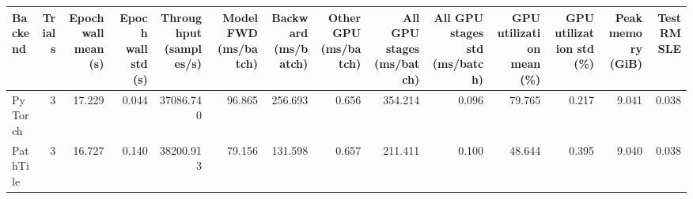 \begin{tabular}{lrrrrrrrrrrrrr}
\toprule
Backend & Trials & Epoch wall mean (s) & Epoch wall std (s) & Throughput (samples/s) & Model FWD (ms/batch) & Backward (ms/batch) & Other GPU (ms/batch) & All GPU stages (ms/batch) & All GPU stages std (ms/batch) & GPU utilization mean (\%) & GPU utilization std (\%) & Peak memory (GiB) & Test RMSLE \\
\midrule
PyTorch & 3 & 17.229 & 0.044 & 37086.740 & 96.865 & 256.693 & 0.656 & 354.214 & 0.096 & 79.765 & 0.217 & 9.041 & 0.038 \\
PathTile & 3 & 16.727 & 0.140 & 38200.913 & 79.156 & 131.598 & 0.657 & 211.411 & 0.100 & 48.644 & 0.395 & 9.040 & 0.038 \\
\bottomrule
\end{tabular}
